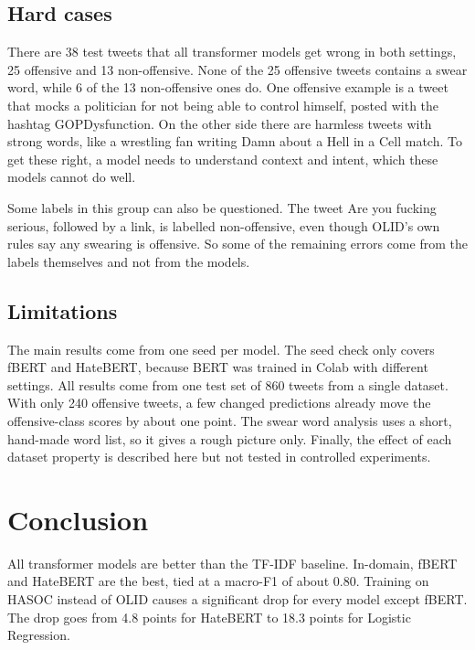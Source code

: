 \documentclass[11pt,a4paper]{article}
\begin{document}
\subsection{Hard cases}

There are 38 test tweets that all transformer models get wrong in both settings, 25 offensive and 13 non-offensive. None of the 25 offensive tweets contains a swear word, while 6 of the 13 non-offensive ones do. One offensive example is a tweet that mocks a politician for not being able to control himself, posted with the hashtag GOPDysfunction. On the other side there are harmless tweets with strong words, like a wrestling fan writing Damn about a Hell in a Cell match. To get these right, a model needs to understand context and intent, which these models cannot do well.

Some labels in this group can also be questioned. The tweet Are you fucking serious, followed by a link, is labelled non-offensive, even though OLID's own rules say any swearing is offensive. So some of the remaining errors come from the labels themselves and not from the models.

\subsection{Limitations}

The main results come from one seed per model. The seed check only covers fBERT and HateBERT, because BERT was trained in Colab with different settings. All results come from one test set of 860 tweets from a single dataset. With only 240 offensive tweets, a few changed predictions already move the offensive-class scores by about one point. The swear word analysis uses a short, hand-made word list, so it gives a rough picture only. Finally, the effect of each dataset property is described here but not tested in controlled experiments.

\section{Conclusion}

All transformer models are better than the TF-IDF baseline. In-domain, fBERT and HateBERT are the best, tied at a macro-F1 of about 0.80. Training on HASOC instead of OLID causes a significant drop for every model except fBERT. The drop goes from 4.8 points for HateBERT to 18.3 points for Logistic Regression.
\end{document}

